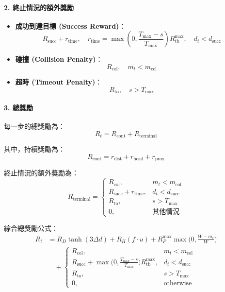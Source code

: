 \documentclass[12pt,a4paper]{article}
\begin{document}
\paragraph{2. 終止情況的額外獎勵}
\begin{itemize}
    \item \textbf{成功到達目標 (Success Reward)}：
    \[
    R_{\text{succ}} + r_{\text{time}}, \quad
    r_{\text{time}} = \max\!\left(0, \frac{T_{\max}-s}{T_{\max}}\right) R_{\text{tb}}^{\max}, \quad d_t<d_{\text{succ}}
    \]
    \item \textbf{碰撞 (Collision Penalty)}：
    \[
    R_{\text{col}}, \quad m_t < m_{\text{col}}
    \]
    \item \textbf{超時 (Timeout Penalty)}：
    \[
    R_{\text{to}}, \quad s > T_{\max}
    \]
\end{itemize}

\paragraph{3. 總獎勵}
每一步的總獎勵為：
\[
R_t = R_{\text{cont}} + R_{\text{terminal}}
\]

其中，持續獎勵為：
\[
R_{\text{cont}} = r_{\text{dist}} + r_{\text{head}} + r_{\text{prox}}
\]

終止情況的額外獎勵為：
\[
R_{\text{terminal}} =
\begin{cases}
R_{\text{col}}, & m_t < m_{\text{col}} \\
R_{\text{succ}} + r_{\text{time}}, & d_t < d_{\text{succ}} \\
R_{\text{to}}, & s > T_{\max} \\
0, & \text{其他情況}
\end{cases}
\]

綜合總獎勵公式：
\[
\begin{aligned}
R_t &= R_D \tanh(3 \Delta d) + R_H (f \cdot u) + R_P^{\max} \max\!\Big(0,\frac{W-m_t}{W}\Big) \\
&\quad +
\begin{cases}
R_{\text{col}}, & m_t < m_{\text{col}}\\
R_{\text{succ}} + \displaystyle \max\!\Big(0,\frac{T_{\max}-s}{T_{\max}}\Big) R_{\text{tb}}^{\max}, & d_t < d_{\text{succ}}\\
R_{\text{to}}, & s > T_{\max}\\
0, & \text{otherwise}
\end{cases}
\end{aligned}
\]
\end{document}
